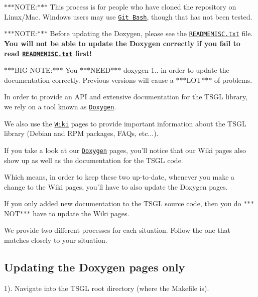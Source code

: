 $\ast$$\ast$$\ast$\-N\-O\-T\-E\-:$\ast$$\ast$$\ast$ This process is for people who have cloned the repository on Linux/\-Mac. Windows users may use \href{https://git-scm.com/download/win}{\tt Git Bash}, though that has not been tested.

$\ast$$\ast$$\ast$\-N\-O\-T\-E\-:$\ast$$\ast$$\ast$ Before updating the Doxygen, please see the \href{https://github.com/Calvin-CS/TSGL/blob/master/READMEMISC.txt}{\tt R\-E\-A\-D\-M\-E\-M\-I\-S\-C.\-txt} file. {\bfseries You will not be able to update the Doxygen correctly if you fail to read \href{https://github.com/Calvin-CS/TSGL/blob/master/READMEMISC.txt}{\tt R\-E\-A\-D\-M\-E\-M\-I\-S\-C.\-txt} first!}

$\ast$$\ast$$\ast$\-B\-I\-G N\-O\-T\-E\-:$\ast$$\ast$$\ast$ You $\ast$$\ast$$\ast$\-N\-E\-E\-D$\ast$$\ast$$\ast$ doxygen 1.. in order to update the documentation correctly. Previous versions will cause a $\ast$$\ast$$\ast$\-L\-O\-T$\ast$$\ast$$\ast$ of problems.

In order to provide an A\-P\-I and extensive documentation for the T\-S\-G\-L library, we rely on a tool known as \href{http://www.stack.nl/~dimitri/doxygen/}{\tt Doxygen}.

We also use the \href{https://github.com/Calvin-CS/TSGL/wiki}{\tt Wiki} pages to provide important information about the T\-S\-G\-L library (Debian and R\-P\-M packages, F\-A\-Qs, etc...).

If you take a look at our \href{http://calvin-cs.github.io/TSGL/html/pages.html}{\tt Doxygen} pages, you'll notice that our Wiki pages also show up as well as the documentation for the T\-S\-G\-L code.

Which means, in order to keep these two up-\/to-\/date, whenever you make a change to the Wiki pages, you'll have to also update the Doxygen pages.

If you only added new documentation to the T\-S\-G\-L source code, then you do $\ast$$\ast$$\ast$\-N\-O\-T$\ast$$\ast$$\ast$ have to update the Wiki pages.

We provide two different processes for each situation. Follow the one that matches closely to your situation.

\subsection*{Updating the Doxygen pages only}

1). Navigate into the T\-S\-G\-L root directory (where the Makefile is).

